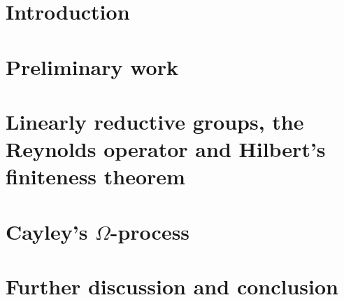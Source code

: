 \documentclass[a4paper]{article}
\theoremstyle{prrt}
\begin{document}


\newpage

\tableofcontents
\vfill

\section{Introduction}



\section{Preliminary work}\label{pw}



\section{Linearly reductive groups, the Reynolds operator and Hilbert's finiteness theorem}



\section{Cayley's $\Omega$-process}



\section{Further discussion and conclusion}



\newpage

% 
%
% 


\end{document}
